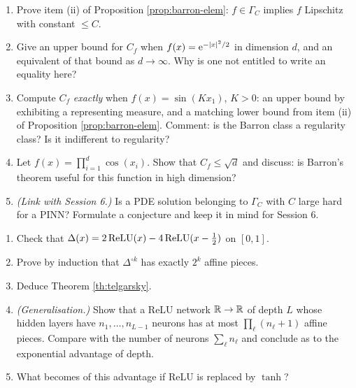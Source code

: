 \documentclass[11pt,a4paper]{article}
\begin{document}
\begin{exercise}\label{ex:barron}
\leavevmode
\begin{enumerate}[label=\textbf{\arabic*.}]
\item Prove item (ii) of Proposition \ref{prop:barron-elem}: $f \in \Gamma_C$ implies $f$ Lipschitz
with constant $\le C$.
\item Give an upper bound for $C_f$ when $f(x) = \mathrm{e}^{-\left\lvert x \right\rvert^2/2}$ in dimension $d$, and an
equivalent of that bound as $d \to \infty$. Why is one not entitled to write an equality here?
\item Compute $C_f$ \emph{exactly} when $f(x) = \sin(K x_1)$, $K > 0$: an upper bound by exhibiting
a representing measure, and a matching lower bound from item (ii) of
Proposition \ref{prop:barron-elem}. Comment: is the Barron class a regularity class? Is it
indifferent to regularity?
\item Let $f(x) = \prod_{i=1}^d \cos(x_i)$. Show that $C_f \le \sqrt d$ and discuss: is Barron's
theorem useful for this function in high dimension?
\item \emph{(Link with Session 6.)} Is a PDE solution belonging to $\Gamma_C$ with $C$ large hard
for a PINN? Formulate a conjecture and keep it in mind for Session 6.
\end{enumerate}
\end{exercise}

\begin{exercise}\label{ex:telgarsky}
\leavevmode
\begin{enumerate}[label=\textbf{\arabic*.}]
\item Check that $\Delta(x) = 2\operatorname{ReLU}(x) - 4\operatorname{ReLU}(x - \tfrac12)$ on $[0,1]$.
\item Prove by induction that $\Delta^{\circ k}$ has exactly $2^k$ affine pieces.
\item Deduce Theorem \ref{th:telgarsky}.
\item \emph{(Generalisation.)} Show that a ReLU network $\mathbb{R} \to \mathbb{R}$ of depth $L$ whose hidden layers
have $n_1,\dots,n_{L-1}$ neurons has at most $\prod_{\ell}(n_\ell + 1)$ affine pieces. Compare with
the number of neurons $\sum_\ell n_\ell$ and conclude as to the exponential advantage of depth.
\item What becomes of this advantage if ReLU is replaced by $\tanh$?
\end{enumerate}
\end{exercise}

\end{document}
